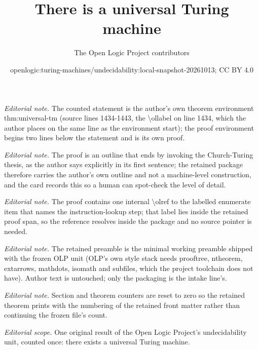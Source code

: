 \documentclass[10pt,a4paper]{article}
\title{There is a universal Turing machine}
\author{The Open Logic Project contributors}
\date{openlogic:turing-machines/undecidability:local-snapshot-20261013; CC BY 4.0}
\theoremstyle{plain}
\theoremstyle{definition}
\theoremstyle{remark}
\begin{document}
\maketitle
\setcounter{section}{0}
\setcounter{thm}{0}
\noindent\textit{Editorial note.} The counted statement is the author's own theorem environment thm:universal-tm (source lines 1434-1443, the \textbackslash{}ollabel on line 1434, which the author places on the same line as the environment start); the proof environment begins two lines below the statement and is its own proof.\par\medskip
\noindent\textit{Editorial note.} The proof is an outline that ends by invoking the Church-Turing thesis, as the author says explicitly in its first sentence; the retained package therefore carries the author's own outline and not a machine-level construction, and the card records this so a human can spot-check the level of detail.\par\medskip
\noindent\textit{Editorial note.} The proof contains one internal \textbackslash{}olref to the labelled enumerate item that names the instruction-lookup step; that label lies inside the retained proof span, so the reference resolves inside the package and no source pointer is needed.\par\medskip
\noindent\textit{Editorial note.} The retained preamble is the minimal working preamble shipped with the frozen OLP unit (OLP's own style stack needs prooftree, ntheorem, extarrows, mathdots, isomath and subfiles, which the project toolchain does not have). Author text is untouched; only the packaging is the intake line's.\par\medskip
\noindent\textit{Editorial note.} Section and theorem counters are reset to zero so the retained theorem prints with the numbering of the retained front matter rather than continuing the frozen file's count.\par\medskip
\noindent\textit{Editorial scope.} One original result of the Open Logic Project's undecidability unit, counted once: there exists a universal Turing machine.\par\medskip
\end{document}
